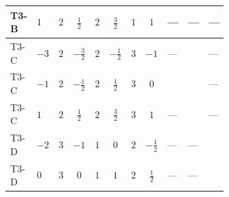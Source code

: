 \documentclass[8pt]{article}
\begin{document}
\begin{landscape}
\begin{longtable}{@{}llcccccc >{\raggedright\arraybackslash}p{0.21\linewidth} >{\raggedright\arraybackslash}p{0.21\linewidth} >{\raggedright\arraybackslash}p{0.21\linewidth}@{}}
\midrule
T3-B & $1$ & $2$ & $\frac{1}{2}$ & $2$ & $\frac{3}{2}$ & $1$ & $1$ & --- & --- & --- \\
\midrule
T3-C & $-3$ & $2$ & $-\frac{3}{2}$ & $2$ & $-\frac{1}{2}$ & $3$ & $-1$ & --- & \scriptsize\adjustbox{max width=\linewidth}{$\begin{gathered} {\lambda_{HS_2}^{(1)}} (3 T_{\nu}^{(2)}+6 \operatorname{Tr}\!\left({Y_d}\,\left({Y_d}\right)^{\dagger}\right)+2 \operatorname{Tr}\!\left({Y_e}\,\left({Y_e}\right)^{\dagger}\right)+6 \operatorname{Tr}\!\left({Y_u}\,\left({Y_u}\right)^{\dagger}\right))\end{gathered}$} & --- \\
\midrule
T3-C & $-1$ & $2$ & $-\frac{1}{2}$ & $2$ & $\frac{1}{2}$ & $3$ & $0$ & \scriptsize\adjustbox{max width=\linewidth}{$\begin{gathered} +24 {\lambda_{8}} \left({\lambda_{8}}\right)^{*}\end{gathered}$} & \scriptsize\adjustbox{max width=\linewidth}{$\begin{gathered} {\lambda_{HS_2}^{(1)}} (3 T_{\nu}^{(2)}+6 \operatorname{Tr}\!\left({Y_d}\,\left({Y_d}\right)^{\dagger}\right)+2 \operatorname{Tr}\!\left({Y_e}\,\left({Y_e}\right)^{\dagger}\right)+6 \operatorname{Tr}\!\left({Y_u}\,\left({Y_u}\right)^{\dagger}\right))\end{gathered}$} & --- \\
\midrule
T3-C & $1$ & $2$ & $\frac{1}{2}$ & $2$ & $\frac{3}{2}$ & $3$ & $1$ & --- & \scriptsize\adjustbox{max width=\linewidth}{$\begin{gathered} {\lambda_{HS_2}^{(1)}} (3 T_{\nu}^{(2)}+6 \operatorname{Tr}\!\left({Y_d}\,\left({Y_d}\right)^{\dagger}\right)+2 \operatorname{Tr}\!\left({Y_e}\,\left({Y_e}\right)^{\dagger}\right)+6 \operatorname{Tr}\!\left({Y_u}\,\left({Y_u}\right)^{\dagger}\right))\end{gathered}$} & --- \\
\midrule
T3-D & $-2$ & $3$ & $-1$ & $1$ & $0$ & $2$ & $-\frac{1}{2}$ & --- & --- & \scriptsize\adjustbox{max width=\linewidth}{$\begin{gathered} {\lambda_{HS_2}^{(1)}} (4 T_{\nu}^{(2)}+6 \operatorname{Tr}\!\left({Y_d}\,\left({Y_d}\right)^{\dagger}\right)+2 \operatorname{Tr}\!\left({Y_e}\,\left({Y_e}\right)^{\dagger}\right)+6 \operatorname{Tr}\!\left({Y_u}\,\left({Y_u}\right)^{\dagger}\right))\end{gathered}$} \\
\midrule
T3-D & $0$ & $3$ & $0$ & $1$ & $1$ & $2$ & $\frac{1}{2}$ & --- & --- & \scriptsize\adjustbox{max width=\linewidth}{$\begin{gathered} {\lambda_{HS_2}^{(1)}} (4 T_{\nu}^{(2)}+6 \operatorname{Tr}\!\left({Y_d}\,\left({Y_d}\right)^{\dagger}\right)+2 \operatorname{Tr}\!\left({Y_e}\,\left({Y_e}\right)^{\dagger}\right)+6 \operatorname{Tr}\!\left({Y_u}\,\left({Y_u}\right)^{\dagger}\right))\end{gathered}$} \\

\end{longtable}
\end{landscape}
\end{document}
